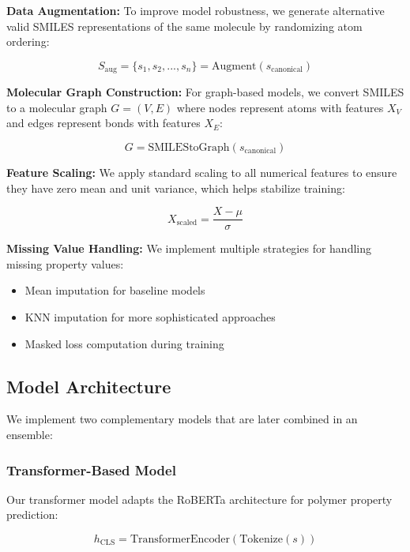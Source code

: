 \documentclass[10pt,twocolumn,letterpaper]{article}
\begin{document}
\textbf{Data Augmentation:} To improve model robustness, we generate alternative valid SMILES representations of the same molecule by randomizing atom ordering:

\begin{equation}
S_{\text{aug}} = \{s_1, s_2, ..., s_n\} = \text{Augment}(s_{\text{canonical}})
\end{equation}

\textbf{Molecular Graph Construction:} For graph-based models, we convert SMILES to a molecular graph $G = (V, E)$ where nodes represent atoms with features $X_V$ and edges represent bonds with features $X_E$:

\begin{equation}
G = \text{SMILEStoGraph}(s_{\text{canonical}})
\end{equation}

\textbf{Feature Scaling:} We apply standard scaling to all numerical features to ensure they have zero mean and unit variance, which helps stabilize training:

\begin{equation}
X_{\text{scaled}} = \frac{X - \mu}{\sigma}
\end{equation}

\textbf{Missing Value Handling:} We implement multiple strategies for handling missing property values:
\begin{itemize}
    \item Mean imputation for baseline models
    \item KNN imputation for more sophisticated approaches
    \item Masked loss computation during training
\end{itemize}

\subsection{Model Architecture}

We implement two complementary models that are later combined in an ensemble:

\subsubsection{Transformer-Based Model}

Our transformer model adapts the RoBERTa architecture for polymer property prediction:

\begin{equation}
h_{\text{CLS}} = \text{TransformerEncoder}(\text{Tokenize}(s))
\end{equation}
\end{document}
